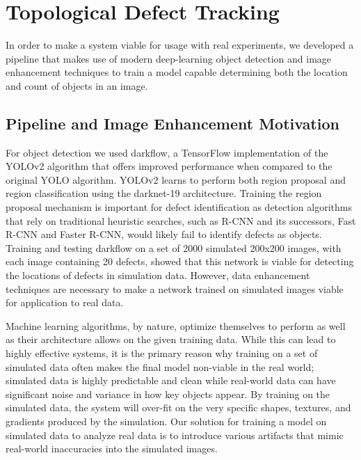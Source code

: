 \documentclass[twoside,twocolumn,9pt]{article}
\begin{document}

\section{Topological Defect Tracking}

In order to make a system viable for usage with real experiments, we developed a pipeline that makes use of modern deep-learning object detection and image enhancement techniques to train a model capable determining both the location and count of objects in an image. 

\subsection{Pipeline and Image Enhancement Motivation}
For object detection we used darkflow\cite{trinh_darkflow_2018}, a TensorFlow implementation of the YOLOv2 algorithm \cite{redmon_yolo9000:_2016} that offers improved performance when compared to the original YOLO algorithm\cite{redmon_you_2015}. YOLOv2 learns to perform both region proposal and region classification using the darknet-19 architecture. Training the region proposal mechanism is important for defect identification as detection algorithms that rely on traditional heuristic searches, such as R-CNN\cite{girshick_rich_2013} and its successors, Fast R-CNN\cite{girshick_fast_2015} and Faster R-CNN\cite{ren_faster_2017}, would likely fail to identify defects as objects. Training and testing darkflow on a set of 2000 simulated 200x200 images, with each image containing 20 defects, showed that this network is viable for detecting the locations of defects in simulation data. However, data enhancement techniques are necessary to make a network trained on simulated images viable for application to real data.

Machine learning algorithms, by nature, optimize themselves to perform as well as their architecture allows on the given training data. While this can lead to highly effective systems, it is the primary reason why training on a set of simulated data often makes the final model non-viable in the real world; simulated data is highly predictable and clean while real-world data can have significant noise and variance in how key objects appear. By training on the simulated data, the system will over-fit\cite{lawrence_lessons_1997} \cite{lever_model_2016} on the very specific shapes, textures, and gradients produced by the simulation. %
Our solution for training a model on simulated data to analyze real data is to introduce various artifacts that mimic real-world inaccuracies into the simulated images.
\end{document}

